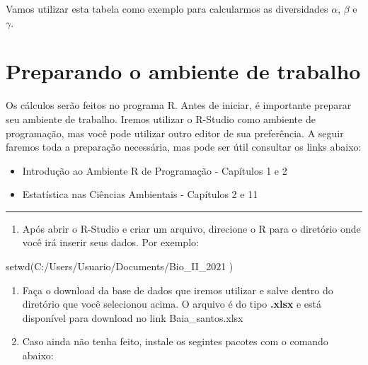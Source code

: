 \documentclass[
]{book}
\newenvironment{Shaded}{\begin{snugshade}}{\end{snugshade}}
\newcommand{\FunctionTok}[1]{\textcolor[rgb]{0.00,0.00,0.00}{#1}}
\newcommand{\NormalTok}[1]{#1}
\newcommand{\StringTok}[1]{\textcolor[rgb]{0.31,0.60,0.02}{#1}}
\providecommand{\tightlist}{%
  \setlength{\itemsep}{0pt}\setlength{\parskip}{0pt}}
\begin{document}
Vamos utilizar esta tabela como exemplo para calcularmos as diversidades \(\alpha\), \(\beta\) e \(\gamma\).

\hypertarget{preparando-o-ambiente-de-trabalho}{%
\section{Preparando o ambiente de trabalho}\label{preparando-o-ambiente-de-trabalho}}

Os cálculos serão feitos no programa R. Antes de iniciar, é importante preparar seu ambiente de trabalho. Iremos utilizar o R-Studio como ambiente de programação, mas você pode utilizar outro editor de sua preferência. A seguir faremos toda a preparação necessária, mas pode ser útil consultar os links abaixo:

\begin{itemize}
\item
  Introdução ao Ambiente R de Programação - Capítulos 1 e 2
\item
  Estatística nas Ciências Ambientais - Capítulos 2 e 11
\end{itemize}

\begin{center}\rule{0.5\linewidth}{0.5pt}\end{center}

\begin{enumerate}
\def\labelenumi{\arabic{enumi}.}
\tightlist
\item
  Após abrir o R-Studio e criar um arquivo, direcione o R para o diretório onde você irá inserir seus dados. Por exemplo:
\end{enumerate}

\begin{Shaded}
\begin{Highlighting}[]
\FunctionTok{setwd}\NormalTok{(}\StringTok{\textquotesingle{}C:/Users/Usuario/Documents/Bio\_II\_2021\textquotesingle{}}\NormalTok{ )}
\end{Highlighting}
\end{Shaded}

\begin{enumerate}
\def\labelenumi{\arabic{enumi}.}
\setcounter{enumi}{1}
\item
  Faça o download da base de dados que iremos utilizar e salve dentro do diretório que você selecionou acima. O arquivo é do tipo \textbf{.xlsx} e está disponível para download no link Baia\_santos.xlsx
\item
  Caso ainda não tenha feito, instale os segintes pacotes com o comando abaixo:
\end{enumerate}
\end{document}
